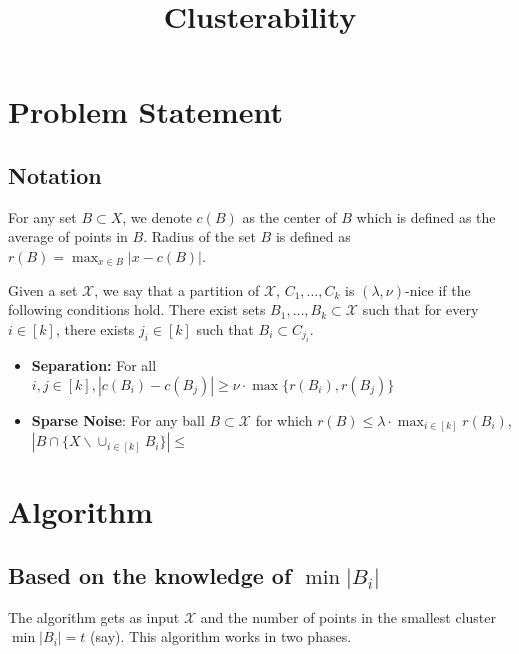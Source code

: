 \documentclass[11pt]{article}
\title{\LARGE Clusterability}
\author{}
\begin{document}
\maketitle

\section{Problem Statement}

\subsection{Notation}
For any set $B\subset X$, we denote $c(B)$ as the center of $B$ which is defined as the average of points in $B$. Radius of the set $B$ is defined as $r(B)=\max_{x\in B} |x-c(B)|$.

\begin{definition}
Given a set $\mathcal{X}$, we say that a partition of $\mathcal{X}$, $C_1,\ldots,C_k$ is $(\lambda,\nu)$-nice if the following conditions hold. There exist sets $B_1,\ldots,B_k\subset \mathcal{X}$ such that for every $i\in[k]$, there exists $j_i\in[k]$ such that $B_i\subset C_{j_i}$.
\begin{itemize}
\item{\bf{Separation}:} For all $i,j\in[k], |c(B_i)-c(B_j)|\geq \nu\cdot\max\{r(B_i),r(B_j)\}$
\item{\bf{Sparse Noise}}: For any ball $B\subset \mathcal{X}$ for which $r(B)\leq \lambda \cdot \max_{i\in[k]} r(B_i)$, $|B\cap \{X \backslash \cup_{i\in[k]} B_i\}|\leq$ 
\end{itemize}
\end{definition}

\section{Algorithm}

\subsection{Based on the knowledge of $\min |B_i|$}
The algorithm gets as input $\mathcal{X}$ and the number of points in the smallest cluster $\min |B_i| = t$ (say). This algorithm works in two phases.
\end{document}
